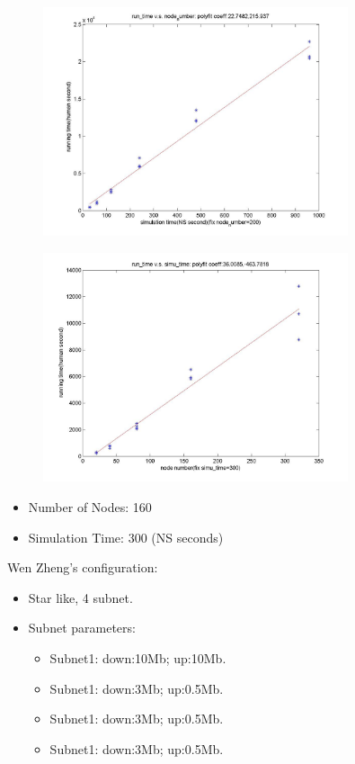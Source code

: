 \documentclass[11pt,a4paper]{article}
\begin{document}
\begin{figure}
	\includegraphics[width=0.8\textwidth]{../fig/runtime_vs_nodenum.jpg}
\end{figure}

\begin{figure}
	\includegraphics[width=0.8\textwidth]{../fig/runtime_vs_simutime.jpg}
\end{figure}

\begin{itemize}
	\item Number of Nodes: 160
	\item Simulation Time: 300 (NS seconds)
\end{itemize}

Wen Zheng's configuration:
\begin{itemize}
	\item Star like, 4 subnet. 
	\item Subnet parameters:
		\begin{itemize}
			\item Subnet1: down:10Mb; up:10Mb. 
			\item Subnet1: down:3Mb; up:0.5Mb. 
			\item Subnet1: down:3Mb; up:0.5Mb. 
			\item Subnet1: down:3Mb; up:0.5Mb. 
		\end{itemize}
\end{itemize}
\end{document}
